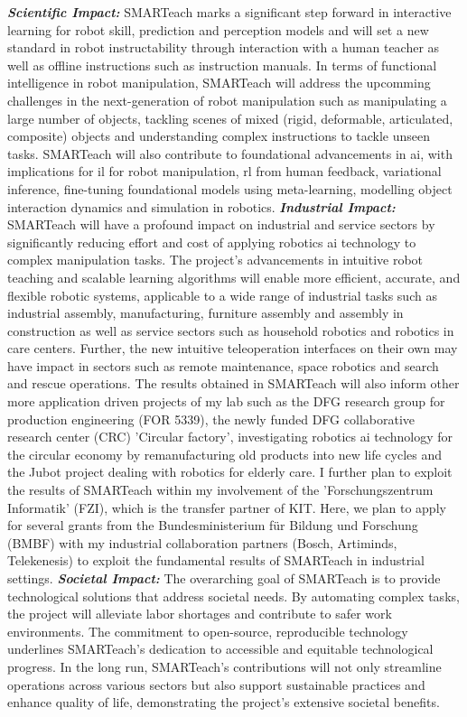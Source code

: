 \documentclass{erc-B2}
\begin{document}
\textbf{\textit{Scientific Impact:}} SMARTeach marks a significant step forward in interactive  learning for robot skill, prediction and perception models and will set a new standard in robot instructability through interaction with a human teacher as well as  offline instructions such as instruction manuals. In terms of functional intelligence in robot manipulation, SMARTeach will address the upcomming challenges in the next-generation of robot manipulation such as manipulating a large number of objects, tackling scenes of mixed (rigid, deformable, articulated, composite) objects and understanding complex instructions to tackle unseen tasks. SMARTeach will also contribute to foundational advancements in \gls*{ai}, with implications for \gls*{il} for robot manipulation, \gls*{rl} from human feedback, variational inference, fine-tuning foundational models using meta-learning, modelling object interaction dynamics and simulation in robotics. 
\newline
\textbf{\textit{Industrial Impact:}} SMARTeach will have a profound impact on industrial and service  sectors by significantly reducing effort and cost of applying robotics \gls*{ai} technology to complex manipulation tasks. The project's advancements in intuitive robot teaching and scalable learning algorithms will enable more efficient, accurate, and flexible robotic systems, applicable to a wide range of industrial tasks such as industrial assembly, manufacturing, furniture assembly and assembly in construction as well as service sectors such as household robotics and robotics in care centers. Further, the new intuitive teleoperation interfaces on their own may have impact in sectors such as remote maintenance, space robotics and search and rescue operations. 
The results obtained in SMARTeach will also inform other more application driven projects of my lab such as the DFG research group for production engineering (FOR 5339), the newly funded DFG collaborative research center (CRC) 'Circular factory', investigating robotics \gls*{ai} technology for the circular economy by remanufacturing old products into new life cycles and the Jubot project dealing with robotics for elderly care. I further plan to exploit the results of SMARTeach within my involvement of the 'Forschungszentrum Informatik' (FZI), which is the transfer partner of KIT. Here, we plan to apply for several grants from the Bundesministerium für Bildung und Forschung (BMBF) with my industrial collaboration partners (Bosch, Artiminds, Telekenesis) to exploit the fundamental results of SMARTeach in industrial settings. \newline
\textbf{\textit{Societal Impact:}} The overarching goal of SMARTeach is to provide technological solutions that address societal needs. By automating complex tasks, the project will alleviate labor shortages and contribute to safer work environments. The commitment to open-source, reproducible technology underlines SMARTeach’s dedication to accessible and equitable technological progress. In the long run, SMARTeach's contributions will not only streamline operations across various sectors but also support sustainable practices and enhance quality of life, demonstrating the project’s extensive societal benefits. 



\pagebreak
\bigskip
\printbibliography[prenote=bolditalics]
\end{document}
